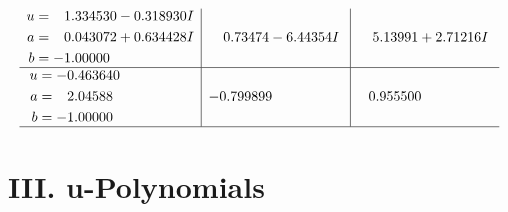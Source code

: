 \documentclass[1p]{elsarticle_modified}
\theoremstyle{definition}
\begin{document}
$$\begin{array}{c|c|c}
\begin{aligned}
u &= \phantom{-}1.334530 - 0.318930 I \\
a &= \phantom{-}0.043072 + 0.634428 I \\
b &= -1.00000\phantom{ +0.000000I}\end{aligned}
 & \phantom{-}0.73474 - 6.44354 I & \phantom{-}5.13991 + 2.71216 I \\ \hline\begin{aligned}
u &= -0.463640\phantom{ +0.000000I} \\
a &= \phantom{-}2.04588\phantom{ +0.000000I} \\
b &= -1.00000\phantom{ +0.000000I}\end{aligned}
 & -0.799899\phantom{ +0.000000I} & \phantom{-}0.955500\phantom{ +0.000000I}\\
 \hline 
 \end{array}$$\newpage
\newpage\renewcommand{\arraystretch}{1}
\centering \section*{ III. u-Polynomials}
\end{document}
